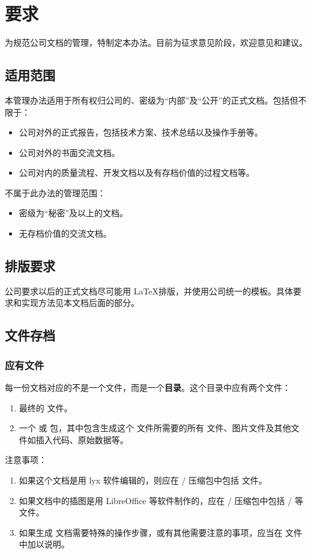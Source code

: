 \chapter{要求}

为规范公司文档的管理，特制定本办法。目前为征求意见阶段，欢迎意见和建议。
\section{适用范围}
本管理办法适用于所有权归公司的、密级为“内部”及“公开”的正式文档。包括但不限于：
\begin{itemize}
\item 公司对外的正式报告，包括技术方案、技术总结以及操作手册等。
\item 公司对外的书面交流文档。
\item 公司对内的质量流程、开发文档以及有存档价值的过程文档等。
\end{itemize}
不属于此办法的管理范围：
\begin{itemize}
\item 密级为“秘密”及以上的文档。
\item 无存档价值的交流文档。
\end{itemize}

\section{排版要求}
公司要求以后的正式文档尽可能用 \LaTeX 排版，并使用公司统一的模板。具体要求和实现方法见本文档后面的部分。

\section{文件存档}

\subsection{应有文件}
每一份文档对应的不是一个文件，而是一个{\bf 目录}。这个目录中应有两个文件：
\begin{enumerate}
\item 最终的  文件。
\item 一个  或  包，其中包含生成这个  文件所需要的所有  文件、图片文件及其他文件如插入代码、原始数据等。
\end{enumerate}
注意事项：
\begin{enumerate}
\item 如果这个文档是用 lyx 软件编辑的，则应在 / 压缩包中包括  文件。
\item 如果文档中的插图是用 LibreOffice 等软件制作的，应在 / 压缩包中包括 / 等文件。
\item 如果生成  文档需要特殊的操作步骤，或有其他需要注意的事项，应当在  文件中加以说明。
\end{enumerate}

